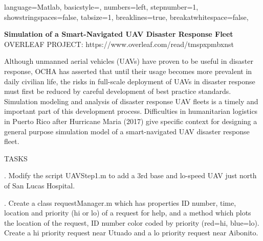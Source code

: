 \documentclass[12pt]{article}
\begin{document}
\lstset
{ %
    language=Matlab,
    basicstyle=\scriptsize,
    numbers=left,
    stepnumber=1,
    showstringspaces=false,
    tabsize=1,
    breaklines=true,
    breakatwhitespace=false,
}

{\bf \flushleft Simulation of  a Smart-Navigated UAV Disaster Response Fleet} 
\small
\\OVERLEAF PROJECT: https://www.overleaf.com/read/tmspxpmbxnst



\vspace{.2in}
{\small Although unmanned aerial vehicles (UAVs) have proven to be useful in disaster response, OCHA has asserted that until their usage becomes more prevalent in daily civilian life, the risks in full-scale deployment of UAVs in disaster response must first be reduced by careful development of best practice standards. Simulation modeling and analysis of disaster response UAV fleets is a timely and important part of this development process. Difficulties in humanitarian logistics in Puerto Rico after Hurricane Maria (2017) give specific context for designing a general purpose simulation model of a  smart-navigated UAV disaster response fleet. }

\newpage
{\flushleft TASKS}

{.}  Modify the script UAVStep1.m to add a 3rd base and lo-speed UAV just north of San Lucas Hospital.


{.} Create a class requestManager.m which has properties ID number,  time, location and priority (hi or lo) of a request for help, and a method which plots the location of the request, ID number color coded by priority (red=hi, blue=lo).  Create a hi priority request near Utuado and a lo priority request near Aibonito.  
\end{document}

